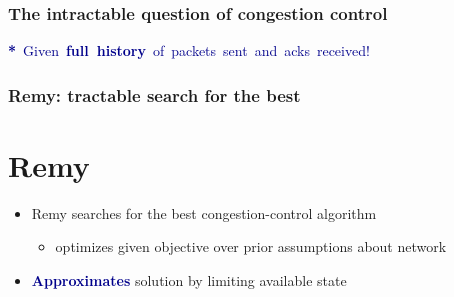 \documentclass[svgnames]{beamer}
\newcommand{\ssline}{\vspace{8 pt}}
\begin{document}
\begin{frame}
\frametitle{The intractable question of congestion control}

\begin{centering}

\ssline
\ssline
\ssline

\pause

\end{centering}

\Large \noindent \hspace{-.5cm} \mbox{\textcolor{DarkBlue}{\textbf{*} Given {\bf full history} of packets sent and acks received!}}

\end{frame}

\begin{frame}
\frametitle{Remy: tractable search for the best}

\section{Remy}

\large

\begin{itemize}

\item Remy searches for the best congestion-control algorithm

\begin{itemize}
\item optimizes given objective over prior assumptions about network
\end{itemize}

\item \textbf{\textcolor{DarkBlue}{Approximates}} solution by limiting available state

\end{itemize}

\end{frame}
\end{document}
